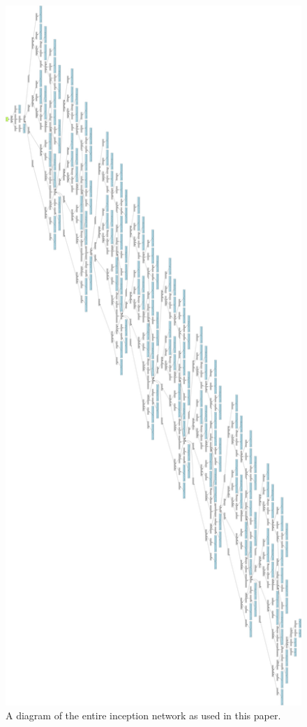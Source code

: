 \begin{figure}
    \centering
    \includegraphics[width=\paperwidth, height=\textheight, keepaspectratio]{images/inceptnet.png}
    \caption{A diagram of the entire inception network as used in this paper.}
    \label{diagram:inceptnet}
\end{figure}

